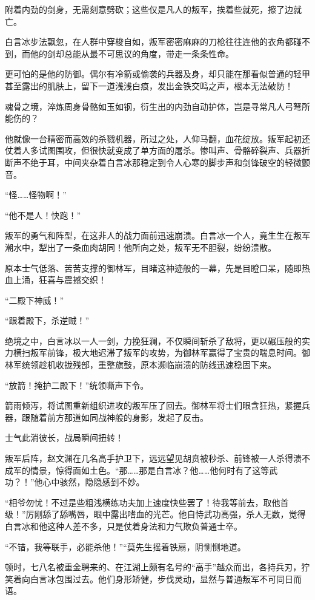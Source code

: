 附着内劲的剑身，无需刻意劈砍；这些仅是凡人的叛军，挨着些就死，擦了边就亡。

白言冰步法飘忽，在人群中穿梭自如，叛军密密麻麻的刀枪往往连他的衣角都碰不到，而他的剑却总能从最不可思议的角度，带走一条条性命。

更可怕的是他的防御。偶尔有冷箭或偷袭的兵器及身，却只能在那看似普通的轻甲甚至露出的肌肤上，留下一道浅浅白痕，发出金铁交鸣之声，根本无法破防！

魂骨之境，淬炼周身骨骼如玉如钢，衍生出的内劲自动护体，岂是寻常凡人弓弩所能伤的？

他就像一台精密而高效的杀戮机器，所过之处，人仰马翻，血花绽放。叛军起初还仗着人多试图围攻，但很快就变成了单方面的屠杀。惨叫声、骨骼碎裂声、兵器折断声不绝于耳，中间夹杂着白言冰那稳定到令人心寒的脚步声和剑锋破空的轻微颤音。

“怪……怪物啊！”

“他不是人！快跑！”

叛军的勇气和阵型，在这非人的战力面前迅速崩溃。白言冰一个人，竟生生在叛军潮水中，犁出了一条血肉胡同！他所向之处，叛军无不胆裂，纷纷溃散。

原本士气低落、苦苦支撑的御林军，目睹这神迹般的一幕，先是目瞪口呆，随即热血上涌，狂喜与震撼交织！

“二殿下神威！”

“跟着殿下，杀逆贼！”

绝境之中，白言冰以一人一剑，力挽狂澜，不仅瞬间斩杀了敌将，更以碾压般的实力横扫叛军前锋，极大地迟滞了叛军的攻势，为御林军赢得了宝贵的喘息时间。御林军统领趁机收拢残部，重整旗鼓，原本濒临崩溃的防线迅速稳固下来。

“放箭！掩护二殿下！”统领嘶声下令。

箭雨倾泻，将试图重新组织进攻的叛军压了回去。御林军将士们眼含狂热，紧握兵器，跟随着前方那道如同战神般的身影，发起了反击。

士气此消彼长，战局瞬间扭转！

叛军后阵，赵文渊在几名高手护卫下，远远望见胡贲被秒杀、前锋被一人杀得溃不成军的情景，惊得面如土色。“那……那是白言冰？他……他何时有了这等武功？！”他心中骇然，隐隐感到不妙。

“相爷勿忧！不过是些粗浅横练功夫加上速度快些罢了！待我等前去，取他首级！”厉刚舔了舔嘴唇，眼中露出嗜血的光芒。他自恃武功高强，杀人无数，觉得白言冰和他这种人差不多，只是仗着身法和力气欺负普通士卒。

“不错，我等联手，必能杀他！”“莫先生摇着铁扇，阴恻恻地道。

顿时，七八名被重金聘来的、在江湖上颇有名号的“高手”越众而出，各持兵刃，狞笑着向白言冰包围过去。他们身形矫健，步伐灵动，显然与普通叛军不可同日而语。

